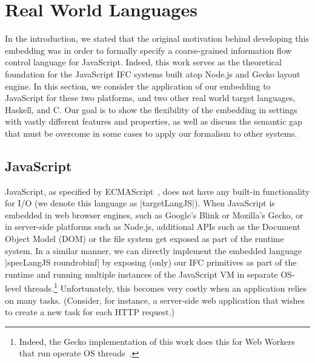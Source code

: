 \section{Real World Languages}
\label{sec:real}

In the introduction, we stated that the original motivation behind
developing this embedding was in order to formally specify a
coarse-grained information flow control language for JavaScript.
%
Indeed, this work serves as the theoretical foundation for the
JavaScript IFC systems built atop Node.js and Gecko layout engine.
%
In this section, we consider the application of our embedding to
JavaScript for these two platforms, and two other real world target
languages, Haskell, and C.
%
Our goal is to show the flexibility of the embedding in settings with
vastly different features and properties, as well as discuss the
semantic gap that must be overcome in some cases to apply our formalism
to other systems.
%



\subsection{JavaScript}
\label{sec:real:js}

JavaScript, as specified by
ECMAScript~\cite{ecma}, does not have any built-in
functionality for I/O
(we denote this language as |targetLangJS|).
%
When JavaScript is embedded in web browser engines, such as Google's
Blink or Mozilla's Gecko, or in server-side platforms such as Node.js,
additional APIs such as the Document Object Model (DOM) or the file
system get exposed as part of the runtime system.
%
In a similar manner, we can directly implement the embedded language
|specLangJS roundrobinf| by exposing (only) our IFC primitives as part
of the runtime and running multiple instances of the JavaScript VM in
separate OS-level threads.\footnote{
  Indeed, the Gecko implementation of this work does this for Web
  Workers that run operate OS threads~\cite{cowl}.
}
%
Unfortunately, this becomes very costly when an application relies on
many tasks.
%
(Consider, for instance, a server-side web application that wishes to
create a new task for each HTTP request.)

